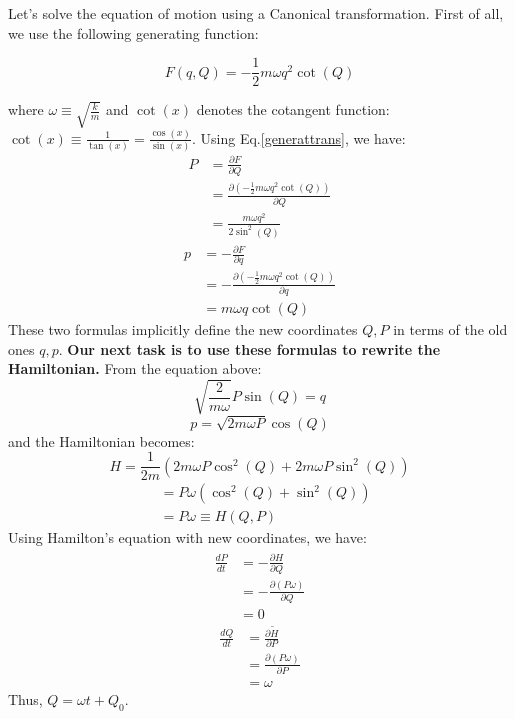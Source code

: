 \bigskip

\bigskip

Let's solve the equation of motion using a Canonical transformation. First of all, we use the following generating function:
\begin{qt}
    \begin{equation}
F(q, Q)=-\frac{1}{2} m \omega q^{2} \cot (Q)
\label{harmoGF}
\end{equation}
\end{qt}
where $\omega \equiv \sqrt{\frac{k}{m}}$ and $\cot (x)$ denotes the cotangent function:
$\cot (x) \equiv \frac{1}{\tan (x)}=\frac{\cos (x)}{\sin (x)}$. Using Eq.\ref{generattrans}, we have:
\begin{equation}
\begin{aligned}
P &=\frac{\partial F}{\partial Q} \\
&=\frac{\partial\left(-\frac{1}{2} m \omega q^{2} \cot (Q)\right)}{\partial Q} \\
&=\frac{m \omega q^{2}}{2 \sin ^{2}(Q)}
\end{aligned}
\end{equation}
\begin{equation}
\begin{aligned}
p &=-\frac{\partial F}{\partial q} \\
&=-\frac{\partial\left(-\frac{1}{2} m \omega q^{2} \cot (Q)\right)}{\partial q} \\
&=m \omega q \cot (Q)
\end{aligned}
\end{equation}
These two formulas implicitly define the new coordinates $Q, P$ in terms of the old ones $q, p .$ \textbf{Our next task is to use these formulas to rewrite the Hamiltonian.} From the equation above:
\begin{equation}
\sqrt{\frac{2}{m \omega}} P \sin (Q)=q
\end{equation}
\begin{equation}
p=\sqrt{2 m \omega P} \cos (Q)
\end{equation}
and the Hamiltonian becomes:
$$
H=\frac{1}{2 m}\left(2 m \omega P \cos ^{2}(Q)+2 m \omega P \sin ^{2}(Q)\right)
$$
$$
\begin{aligned}
&=P \omega\left(\cos ^{2}(Q)+\sin ^{2}(Q)\right)\\
&=P \omega \equiv H(Q, P)
\end{aligned}
$$
Using Hamilton's equation with new coordinates, we have:
$$
\begin{aligned}
\frac{d P}{d t} &=-\frac{\partial \hat{H}}{\partial Q} \\
&=-\frac{\partial(P \omega)}{\partial Q} \\
&=0
\end{aligned}
$$
$$
\begin{aligned}
\frac{d Q}{d t} &=\frac{\partial \tilde{H}}{\partial P} \\
&=\frac{\partial(P \omega)}{\partial P} \\
&=\omega
\end{aligned}
$$
Thus, $Q=\omega t+Q_{0}$.

